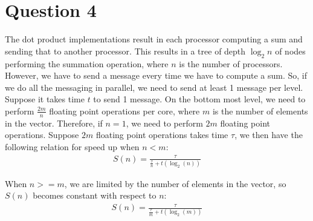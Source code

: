 \documentclass[11pt]{article}
\begin{document}
    \section*{Question 4}
        The dot product implementations result in each processor computing a sum and sending that to another processor. This results in a tree of depth $\log_2 n$ of nodes performing the summation operation, where $n$ is the number of processors. However, we have to send a message every time we have to compute a sum. So, if we do all the messaging in parallel, we need to send at least 1 message per level. Suppose it takes time $t$ to send 1 message. On the bottom most level, we need to perform $\frac{2m}{n}$ floating point operations per core, where $m$ is the number of elements in the vector. Therefore, if $n = 1$, we need to perform $2m$ floating point operations. Suppose $2m$ floating point operations takes time $\tau$, we then have the following relation for speed up when $n < m$:
        \begin{align*}
            S(n) = \frac{\tau}{\frac{\tau}{n} + t(\log_2(n))}
        \end{align*}

        When $n >= m$, we are limited by the number of elements in the vector, so $S(n)$ becomes constant with respect to $n$:
        \begin{align*}
            S(n) = \frac{\tau}{\frac{\tau}{m} + t(\log_2(m))}
        \end{align*}
\end{document}
